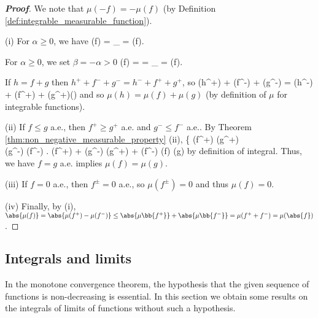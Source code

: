 \begin{proof}[\bf Proof]
We note that $\mu(-f) = -\mu(f)$ (by Definition \ref{def:integrable_measurable_function}).
\ben
\item [(i)] For $\alpha \geq 0$, we have
\be
\mu(\alpha f) = _{} = \alpha\mu(f).
\ee

For $\alpha \geq 0$, we set $\beta = -\alpha >0$
\be
\mu(\alpha f) = \mu{} = _{} = \alpha \mu(f).
\ee

If $h = f + g$ then $h^+ + f^- + g^- = h^- + f^+ + g^+$, so
\be
\mu(h^+) + \mu(f^-) + \mu(g^-) = \mu(h^-) + \mu(f^+) + \mu(g^+)\quad\quad ()
\ee
and so $\mu(h) = \mu(f)+\mu(g)$ (by definition of $\mu$ for integrable functions).

\item [(ii)] If $f \leq g$ a.e., then $f^+ \geq g^+$ a.e. and $g^-\leq f^-$ a.e.. By Theorem \ref{thm:non_negative_measurable_property} (ii),
\be
\left\{
\mu(f^+) \leq \mu(g^+) \\
\mu(g^-) \leq \mu(f^-)
\ea\right. \quad\ra\quad \mu(f^+) + \mu(g^-) \leq \mu(g^+) + \mu(f^-) \quad\ra\quad \mu(f) \leq \mu(g)
\ee
by definition of integral. Thus, we have $f=g$ a.e. implies $\mu(f) = \mu(g)$.

\item [(iii)] If $f = 0$ a.e., then $f^\pm = 0$ a.e., so $\mu(f^\pm) = 0$ and thus $\mu(f) = 0$.

\item [(iv)] Finally, by (i), $\abs{\mu(f)} = \abs{\mu(f^+)-\mu(f^-)} \leq \abs{\mu\bb{f^+}} + \abs{\mu\bb{f^-}} = \mu(f^++f^-) = \mu(\abs{f})$.
\een
\end{proof}

\subsection{Integrals and limits}

In the monotone convergence theorem, the hypothesis that the given sequence of functions is non-decreasing is essential. In this section we obtain some results on the integrals of limits of functions without such a hypothesis.


